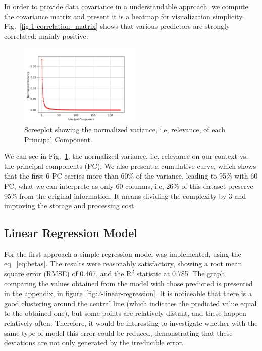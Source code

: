 In order to provide data covariance in a understandable approach, we compute the covariance matrix and present it is a heatmap for visualization simplicity. Fig.~\ref{fig:1-correlation_matrix} shows that various predictors are strongly correlated, mainly positive.

\begin{figure}[htbp!]
  \centerline{\includegraphics[width=0.52\textwidth]{../../code/hw2/figures/0-PCA-screeplot.pdf}}
  \caption{Screeplot showing the normalized variance, i.e, relevance, of each Principal Component.}
  \label{fig:0-PCA-screeplot}
\end{figure}

We can see in Fig.~\ref{fig:0-PCA-screeplot}, the normalized variance, i.e, relevance on our context vs. the principal components (PC). We also present a cumulative curve, which shows that the first 6 PC carries more than 60\% of the variance, leading to 95\% with 60 PC, what we can interprete as only 60 columns, i.e, 26\% of this dataset preserve 95\% from the original information. It means dividing the complexity by 3 and improving the storage and processing cost.

\subsection{Linear Regression Model}

For the first approach a simple regression model was implemented, using the eq.~\ref{eq:betas}. The results were reasonably satisfactory, showing a root mean square error (RMSE) of 0.467, and the $\text{R}^2$ statistic at 0.785. The graph comparing the values obtained from the model with those predicted is presented in the appendix, in figure~\ref{fig:2-linear-regression}. It is noticeable that there is a good clustering around the central line (which indicates the predicted value equal to the obtained one), but some points are relatively distant, and these happen relatively often. Therefore, it would be interesting to investigate whether with the same type of model this error could be reduced, demonstrating that these deviations are not only generated by the irreducible error.

